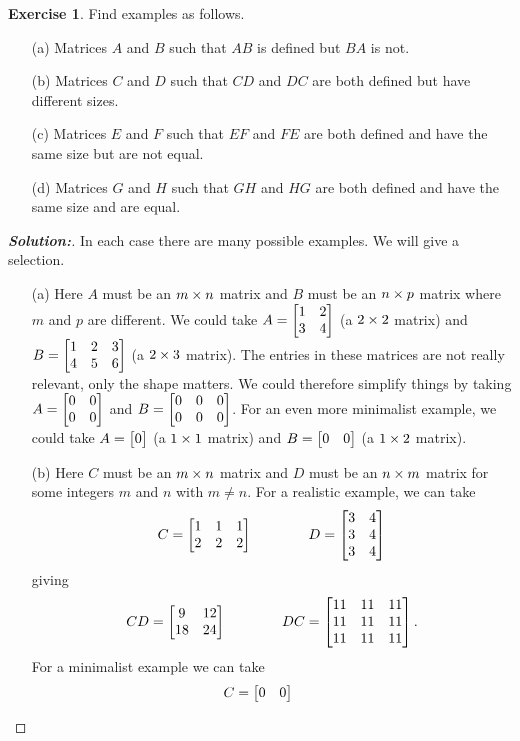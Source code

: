 \documentclass[a4paper]{amsart}
\theoremstyle{definition}
\newtheorem{exercise}{Exercise}
\newenvironment{solution}{\begin{proof}[\textbf{Solution:}] \vphantom{u}}{\end{proof}}
\begin{document}
\begin{exercise}\label{ex-mat-prod-eg-i}
 Find examples as follows.
 \begin{itemize}
  \item[(a)] Matrices $A$ and $B$ such that $AB$ is defined but $BA$
   is not.
  \item[(b)] Matrices $C$ and $D$ such that $CD$ and $DC$ are both
   defined but have different sizes.
  \item[(c)] Matrices $E$ and $F$ such that $EF$ and $FE$ are both
   defined and have the same size but are not equal.
  \item[(d)] Matrices $G$ and $H$ such that $GH$ and $HG$ are both
   defined and have the same size and are equal.
 \end{itemize}
\end{exercise}
\begin{solution}
 In each case there are many possible examples.  We will give a
 selection.
 \begin{itemize}
  \item[(a)] Here $A$ must be an $m\times n$ matrix and $B$ must be an
   $n\times p$ matrix where $m$ and $p$ are different.  We could take
   $A=\left[\begin{matrix} 1&2\\3&4\end{matrix}\right]$ (a $2\times 2$ matrix) and $B=\left[\begin{matrix}
   1&2&3\\4&5&6\end{matrix}\right]$ (a $2\times 3$ matrix).  The entries in these
   matrices are not really relevant, only the shape matters.  We could
   therefore simplify things by taking $A=\left[\begin{matrix} 0&0\\0&0\end{matrix}\right]$ and
   $B=\left[\begin{matrix} 0&0&0\\0&0&0\end{matrix}\right]$.  For an even more minimalist example, we
   could take $A=\left[\begin{matrix} 0 \end{matrix}\right]$ (a $1\times 1$ matrix) and $B=\left[\begin{matrix} 0&0\end{matrix}\right]$
   (a $1\times 2$ matrix).
  \item[(b)] Here $C$ must be an $m\times n$ matrix and $D$ must be an
   $n\times m$ matrix for some integers $m$ and $n$ with $m\neq n$.
   For a realistic example, we can take
   \[ C=\left[\begin{matrix} 1&1&1\\2&2&2\end{matrix}\right] \hspace{4em}
      D=\left[\begin{matrix} 3&4\\3&4\\3&4\end{matrix}\right]
   \]
   giving
   \[ CD = \left[\begin{matrix} 9 & 12 \\ 18 & 24 \end{matrix}\right] \hspace{4em}
      DC = \left[\begin{matrix} 11&11&11 \\ 11&11&11 \\ 11&11&11 \end{matrix}\right].
   \]
   For a minimalist example we can take
   \[ C = \left[\begin{matrix} 0 & 0 \end{matrix}\right] \qquad
\]
\end{itemize}
\end{solution}
\end{document}
